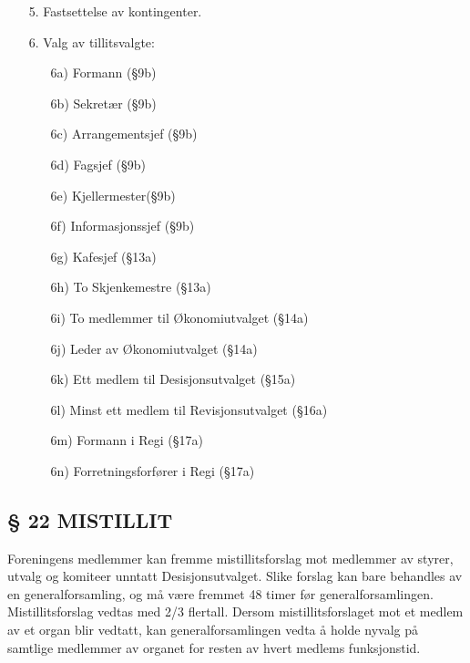 \begin{itemize}
\begin{itemize}
	\item[5.] Fastsettelse av kontingenter. 

	\item[6.] Valg av tillitsvalgte: 

		\begin{itemize}
		\item[6a)] Formann (§9b) 
    
		\item[6b)] Sekretær (§9b) 

		\item[6c)] Arrangementsjef (§9b) 

		\item[6d)] Fagsjef (§9b) 

		\item[6e)] Kjellermester(§9b) 

		\item[6f)] Informasjonssjef (§9b) 

		\item[6g)] Kafesjef (§13a) 

		\item[6h)] To Skjenkemestre (§13a)

		\item[6i)] To medlemmer til Økonomiutvalget (§14a)

		\item[6j)] Leder av Økonomiutvalget (§14a) 

		\item[6k)] Ett medlem til Desisjonsutvalget (§15a) 

		\item[6l)] Minst ett medlem til Revisjonsutvalget (§16a) 

		\item[6m)] Formann i Regi (§17a) 

		\item[6n)] Forretningsforfører i Regi (§17a) 
		\end{itemize}
	\end{itemize}
\end{itemize}


\subsection*{§ 22 MISTILLIT}

Foreningens medlemmer kan fremme mistillitsforslag mot medlemmer av
styrer, utvalg og komiteer unntatt Desisjonsutvalget. Slike forslag
kan bare behandles av en generalforsamling, og må være fremmet 48
timer før generalforsamlingen. Mistillitsforslag vedtas med 2/3
flertall.  Dersom mistillitsforslaget mot et medlem av et organ blir
vedtatt, kan generalforsamlingen vedta å holde nyvalg på samtlige
medlemmer av organet for resten av hvert medlems funksjonstid.


